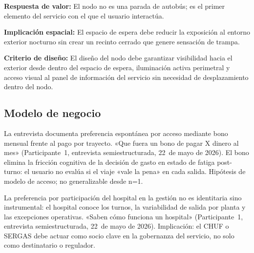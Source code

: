 \textbf{Respuesta de valor:} El nodo no es una parada de
autobús; es el primer elemento del servicio con el que el
usuario interactúa.

\textbf{Implicación espacial:} El espacio de espera debe reducir
la exposición al entorno exterior nocturno sin crear un recinto
cerrado que genere sensación de trampa.

\textbf{Criterio de diseño:} El diseño del nodo debe garantizar
visibilidad hacia el exterior desde dentro del espacio de espera,
iluminación activa perimetral y acceso visual al panel de
información del servicio sin necesidad de desplazamiento dentro
del nodo.

\subsection{Modelo de negocio}
\label{sec:modelo-negocio}
La entrevista documenta preferencia espontánea por acceso mediante
bono mensual frente al pago por trayecto. «Que fuera un bono de pagar
X dinero al mes» (Participante~1, entrevista semiestructurada, 22~de mayo
de 2026). El bono elimina la fricción cognitiva de la decisión de gasto
en estado de fatiga post-turno: el usuario no evalúa si el viaje «vale
la pena» en cada salida. Hipótesis de modelo de acceso; no generalizable
desde n=1.

La preferencia por participación del hospital en la gestión no es
identitaria sino instrumental: el hospital conoce los turnos, la
variabilidad de salida por planta y las excepciones operativas.
«Saben cómo funciona un hospital» (Participante~1, entrevista
semiestructurada, 22~de mayo de 2026). Implicación: el CHUF o SERGAS debe
actuar como socio clave en la gobernanza del servicio, no solo como
destinatario o regulador.

\begin{pendiente}
\end{pendiente}
